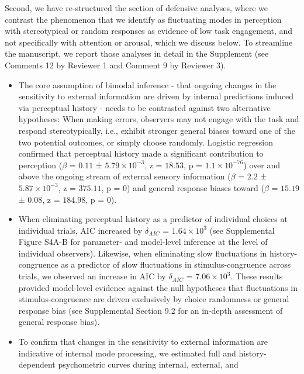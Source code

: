 \documentclass[
]{article}
\begin{document}
Second, we have re-structured the section of defensive analyses, where
we contrast the phenomenon that we identify as fluctuating modes in
perception with stereotypical or random responses as evidence of low
task engagement, and not specifically with attention or arousal, which
we discuss below. To streamline the manuscript, we report those analyses
in detail in the Supplement (see Comments 12 by Reviewer 1 and Comment 9
by Reviewer 3).

\begin{itemize}
\item
  The core assumption of bimodal inference - that ongoing changes in the
  sensitivity to external information are driven by internal predictions
  induced via perceptual history - needs to be contrasted against two
  alternative hypotheses: When making errors, observers may not engage
  with the task and respond stereotypically, i.e., exhibit stronger
  general biases toward one of the two potential outcomes, or simply
  choose randomly. Logistic regression confirmed that perceptual history
  made a significant contribution to perception (\(\beta\) = \(0.11\) ±
  \(\ensuremath{5.79\times 10^{-3}}\), z = \(18.53\), p =
  \(\ensuremath{1.1\times 10^{-76}}\)) over and above the ongoing stream
  of external sensory information (\(\beta\) = \(2.2\) ±
  \(\ensuremath{5.87\times 10^{-3}}\), z = \(375.11\), p = \(0\)) and
  general response biases toward (\(\beta\) = \(15.19\) ± \(0.08\), z =
  \(184.98\), p = \(0\)).
\item
  When eliminating perceptual history as a predictor of individual
  choices at individual trials, AIC increased by \(\delta_{AIC}\) =
  \(\ensuremath{1.64\times 10^{3}}\) (see Supplemental Figure S4A-B for
  parameter- and model-level inference at the level of individual
  observers). Likewise, when eliminating slow fluctuations in
  history-congruence as a predictor of slow fluctuations in
  stimulus-congruence across trials, we observed an increase in AIC by
  \(\delta_{AIC}\) = \(\ensuremath{7.06\times 10^{3}}\). These results
  provided model-level evidence against the null hypotheses that
  fluctuations in stimulus-congruence are driven exclusively by choice
  randomness or general response bias (see Supplemental Section 9.2 for
  an in-depth assessment of general response bias).
\item
  To confirm that changes in the sensitivity to external information are
  indicative of internal mode processing, we estimated full and
  history-dependent psychometric curves during internal, external, and

\end{itemize}
\end{document}
